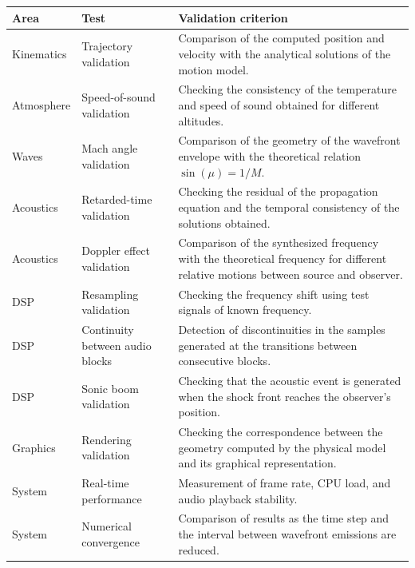 \documentclass[10.5pt]{article}
\begin{document}
	\begin{table}[H]
		\centering
		\label{tab:tests}
		\begin{tabular}{|l|p{4cm}|p{10cm}|}
			\hline
			\textbf{Area} & \textbf{Test} & \textbf{Validation criterion} \\
			\hline
			Kinematics &
			Trajectory validation &
			Comparison of the computed position and velocity with the analytical solutions of the motion model. \\
			\hline
			Atmosphere &
			Speed-of-sound validation &
			Checking the consistency of the temperature and speed of sound obtained for different altitudes. \\
			\hline
			Waves &
			Mach angle validation &
			Comparison of the geometry of the wavefront envelope with the theoretical relation $\sin(\mu)=1/M$. \\
			\hline
			Acoustics &
			Retarded-time validation &
			Checking the residual of the propagation equation and the temporal consistency of the solutions obtained. \\
			\hline
			Acoustics &
			Doppler effect validation &
			Comparison of the synthesized frequency with the theoretical frequency for different relative motions between source and observer. \\
			\hline
			DSP &
			Resampling validation &
			Checking the frequency shift using test signals of known frequency. \\
			\hline
			DSP &
			Continuity between audio blocks &
			Detection of discontinuities in the samples generated at the transitions between consecutive blocks. \\
			\hline
			DSP &
			Sonic boom validation &
			Checking that the acoustic event is generated when the shock front reaches the observer's position. \\
			\hline
			Graphics &
			Rendering validation &
			Checking the correspondence between the geometry computed by the physical model and its graphical representation. \\
			\hline
			System &
			Real-time performance &
			Measurement of frame rate, CPU load, and audio playback stability. \\
			\hline
			System &
			Numerical convergence &
			Comparison of results as the time step and the interval between wavefront emissions are reduced. \\
			\hline
		\end{tabular}
	\end{table}
	
\end{document}
